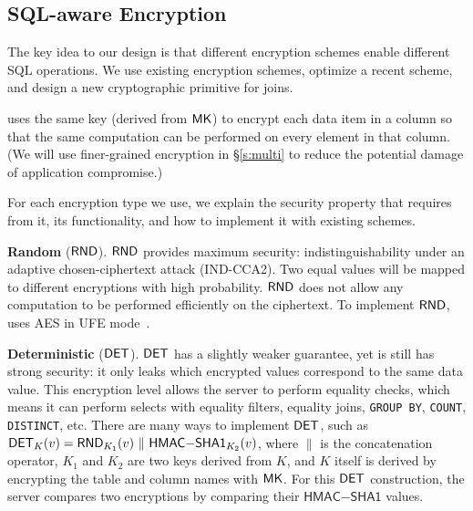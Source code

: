 
\subsection{SQL-aware Encryption}
\label{ss:sqlaware}

The key idea to our design is that different encryption schemes enable
different SQL operations.  We use existing encryption schemes, optimize
a recent scheme, and design a new cryptographic primitive for joins.

\name{} uses the same key (derived from $\mathsf{MK}$) to encrypt each  data item in a column so that the same computation can be performed on every
element in that column. (We will
  use finer-grained encryption in \S\ref{s:multi} to reduce the
  potential damage of application compromise.)

For each encryption type we use, we explain the security property that
\name{} requires from it, its functionality, and how to implement it with existing schemes. 
 
\textbf{Random} ($\mathsf{RND}$)\@. $\mathsf{RND}$ provides maximum security:
indistinguishability under an adaptive chosen-ciphertext attack
(IND-CCA2).  Two equal values will be
mapped to different encryptions with high probability. $\mathsf{RND}$ does not
allow any computation to be performed efficiently on the ciphertext.
To implement $\mathsf{RND}$, \name{} uses AES in UFE mode~\cite{desai:ufe}.

\textbf{Deterministic} ($\mathsf{DET}$)\@. $\mathsf{DET}$ has a slightly weaker
guarantee, yet is still has strong security: it only leaks which encrypted values correspond to the same
data value. This encryption level allows the server to perform
equality checks, which means it can perform selects with equality
filters, equality joins, {\tt GROUP BY}, {\tt COUNT}, {\tt DISTINCT},
etc.  There are
many ways to implement $\mathsf{DET}$, such as $\mathsf{DET}_K(v)=\mathsf{RND}_{K_1}(v) ~ \| ~
\mathsf{HMAC}\mathrm{-}\mathsf{SHA1}_{K_2}(v)$, where $\|$ is the
concatenation operator, $K_1$ and $K_2$ are two keys derived from $K$,
and $K$ itself is derived by encrypting the table and column names
with $\mathsf{MK}$\@.  For this $\mathsf{DET}$ construction, the server compares two
encryptions by comparing their $\mathsf{HMAC}\mathrm{-}\mathsf{SHA1}$
values.

